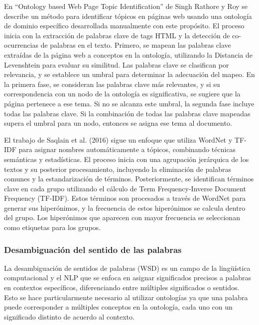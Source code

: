 En ``Ontology based Web Page Topic Identification'' de Singh Rathore y Roy se describe un método para identificar t\'opicos en páginas web usando una ontología de dominio espec\'ifico desarrollada manualmente con este prop\'osito. El proceso inicia con la extracción de palabras clave de tags HTML y la detección de co-ocurrencias de palabras en el texto. Primero, se mapean las palabras clave extraídas de la página web a conceptos en la ontología, utilizando la Distancia de Levenshtein para evaluar su similitud. Las palabras clave se clasifican por relevancia, y se establece un umbral para determinar la adecuación del mapeo. En la primera fase, se consideran las palabras clave más relevantes, y si su correspondencia con un nodo de la ontología es significativa, se sugiere que la página pertenece a ese tema. Si no se alcanza este umbral, la segunda fase incluye todas las palabras clave. Si la combinación de todas las palabras clave mapeadas supera el umbral para un nodo, entonces se asigna ese tema al documento. 

El trabajo de Saqlain et al. (2016) sigue un enfoque que utiliza WordNet y TF-IDF para asignar nombres automáticamente a tópicos, combinando técnicas semánticas y estadísticas. El proceso inicia con una agrupación jerárquica de los textos y su posterior procesamiento, incluyendo la eliminación de palabras comunes y la estandarización de términos. Posteriormente, se identifican términos clave en cada grupo utilizando el cálculo de Term Frequency-Inverse Document Frequency (TF-IDF). Estos términos son procesados a través de WordNet para generar sus hiperónimos, y la frecuencia de estos hiperónimos se calcula dentro del grupo. Los hiperónimos que aparecen con mayor frecuencia se seleccionan como etiquetas para los grupos.

\subsubsection{Desambiguaci\'on del sentido de las palabras}

La desambiguación de sentidos de palabras (WSD) es un campo de la lingüística computacional y el NLP que se enfoca en asignar significados precisos a palabras en contextos específicos, diferenciando entre múltiples significados o sentidos. Esto se hace particularmente necesario al utilizar ontolog\'ias ya que una palabra puede corresponder a m\'ultiples conceptos en la ontolog\'ia, cada uno con un significado distinto de acuerdo al contexto.

